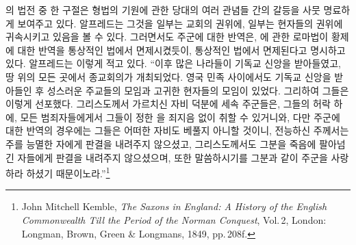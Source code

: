 의 법전 중 한 구절은
형법의 기원에 관한
당대의 여러 관념들 간의 갈등을 사뭇 명료하게 보여주고 있다.
알프레드는 그것을
일부는 교회의 권위에,
일부는 현자들의 권위에
귀속시키고 있음을 볼 수 있다.
그러면서도
주군에 대한 반역은,
에 관한
로마법이
황제에 대한 반역을 통상적인 법에서 면제시켰듯이,
통상적인 법에서 면제된다고 명시하고 있다.
알프레드는 이렇게 적고 있다.
``이후 많은 나라들이 기독교 신앙을 받아들였고,
땅 위의 모든 곳에서 종교회의가 개최되었다.
영국 민족 사이에서도 기독교 신앙을 받아들인 후
성스러운 주교들의 모임과 고귀한 현자들의 모임이 있었다.
그리하여 그들은 이렇게 선포했다.
그리스도께서 가르치신 자비 덕분에
세속 주군들은,
그들의 허락 하에,
모든 범죄자들에게서 그들이 정한 을
죄지음 없이
취할 수 있거니와,
다만 주군에 대한 반역의 경우에는
그들은 어떠한 자비도 베풀지 아니할 것이니,
전능하신 주께서는 주를 능멸한 자에게 판결을 내려주지 않으셨고,
그리스도께서도 그분을 죽음에 팔아넘긴 자들에게 판결을 내려주지 않으셨으며,
또한 말씀하시기를 그분과 같이 주군을 사랑하라 하셨기 때문이노라.''\footnote{%
  \latinmarks
  John Mitchell Kemble,
  \textit{The Saxons in England: A History of the English Commonwealth Till the Period of the Norman Conquest}, Vol.\,2,
  London: Longman, Brown, Green \& Longmans, 1849,
  pp.\,208f.}

